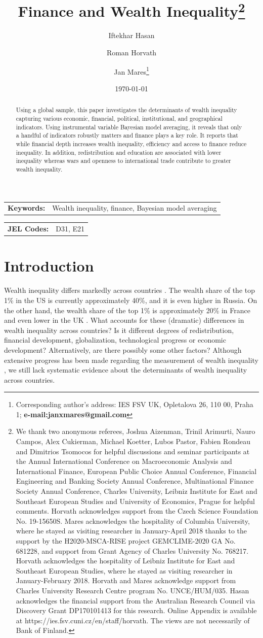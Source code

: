 \documentclass[a4paper,11pt]{article}
\title{Finance and Wealth Inequality\thanks{We thank two anonymous referees, Joshua Aizenman, Trinil Arimurti, Nauro Campos, Alex Cukierman, Michael Koetter, Lubos Pastor, Fabien Rondeau and Dimitrios Tsomocos for helpful discussions and seminar participants at the Annual International Conference on Macroeconomic Analysis and International Finance, European Public Choice Annual Conference, Financial Engineering and Banking Society Annual Conference, Multinational Finance Society Annual Conference, Charles University, Leibniz Institute for East and Southeast European Studies and University of Economics, Prague for helpful comments. Horvath acknowledges support from the Czech Science Foundation No. 19-15650S. Mares acknowledges the hospitality of Columbia University, where he stayed as visiting researcher in January-April 2018 thanks to the support by the H2020-MSCA-RISE project GEMCLIME-2020 GA No. 681228, and support from Grant Agency of Charles University No. 768217. Horvath acknowledges the hospitality of Leibniz Institute for East and Southeast European Studies, where he stayed as visiting researcher in January-February 2018. Horvath and Mares acknowledge support from Charles University Research Centre program No. UNCE/HUM/035. Hasan acknowledges the financial support from the Australian Research Council via Discovery Grant DP170101413 for this research. Online Appendix is available at https://ies.fsv.cuni.cz/en/staff/horvath. The views are not necessarily of Bank of Finland.}}
\author[a,b,c]{Iftekhar Hasan}
\author[d,e]{Roman Horvath}
\author[d]{Jan Mares\footnote{\footnotesize Corresponding author's address: IES FSV UK, Opletalova 26, 110 00, Praha 1; \textbf{e-mail:janxmares@gmail.com}}}
\affil[a]{Fordham University}
\affil[b]{Bank of Finland}
\affil[c]{University of Sydney}
\affil[d]{Charles University, Prague}
\affil[e]{University of Ss. Cyril and Methodius in Trnava}
\date{\today}
\begin{document}
\def\sym#1{\ifmmode^{#1}\else\(^{#1}\)\fi} %

\maketitle

\begin{abstract}
Using a global sample, this paper investigates the determinants of wealth inequality capturing various economic, financial, political, institutional, and geographical indicators. Using instrumental variable Bayesian model averaging, it reveals that only a handful of indicators robustly matters and finance plays a key role. It reports that while financial depth increases wealth inequality, efficiency and access to finance reduce inequality. In addition, redistribution and education are associated with lower inequality whereas wars and openness to international trade contribute to greater wealth inequality.
\end{abstract}

\bigskip

\begin{tabular}{p{0.25\hsize}p{0.6\hsize}} %
\textbf{Keywords:} & Wealth inequality, finance, Bayesian model averaging
\end{tabular}

\bigskip

\begin{tabular}{p{0.25\hsize}p{0.6\hsize}}
\textbf{JEL Codes:} & D31, E21\\
\end{tabular}

\clearpage
\section{Introduction}
\label{sec:intro}

Wealth inequality differs markedly across countries \citep{daviesetal2011,daviesetal2017,milanovic2016global}. The wealth share of the top 1\% in the US is currently approximately 40\%, and it is even higher in Russia. On the other hand, the wealth share of the top 1\% is approximately 20\% in France and even lower in the UK \citep{zucman2019}. What accounts for these (dramatic) differences in wealth inequality across countries? Is it different degrees of redistribution, financial development, globalization, technological progress or economic development? Alternatively, are there possibly some other factors? Although extensive progress has been made regarding the measurement of wealth inequality  \citep{alvaredoetal2013,daviesetal2011,daviesetal2017,pikettyandzucman2014,SaezZucman2016}, we still lack systematic evidence about the determinants of wealth inequality across countries.
\end{document}
